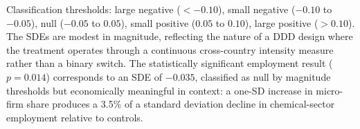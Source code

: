 \documentclass[12pt]{article}
\begin{document}
\begin{table}[H]
{Classification thresholds:
large negative ($< -0.10$), small negative ($-0.10$ to $-0.05$),
null ($-0.05$ to $0.05$), small positive ($0.05$ to $0.10$),
large positive ($> 0.10$).
The SDEs are modest in magnitude, reflecting the nature of a DDD design where the treatment operates through a continuous cross-country intensity measure rather than a binary switch. The statistically significant employment result ($p = 0.014$) corresponds to an SDE of $-0.035$, classified as null by magnitude thresholds but economically meaningful in context: a one-SD increase in micro-firm share produces a 3.5\% of a standard deviation decline in chemical-sector employment relative to controls.
}
\end{table}
\end{document}
